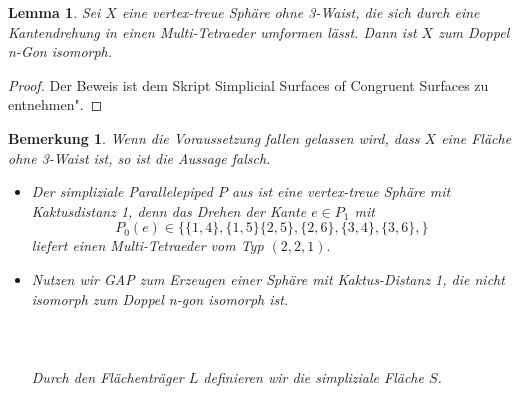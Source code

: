 \documentclass[12pt,titlepage,twoside,cleardoublepage]{article}
\theoremstyle{nummermitklammern}
\newtheorem{lemma}[temp]{Lemma}
\newtheorem{bemerkung}[temp]{Bemerkung}
\newtheorem{lemma}[zahl]{Lemma}
\newtheorem{bemerkung}[zahl]{Bemerkung}
\numberwithin{equation}{section}
\begin{document}
\begin{lemma}
Sei $X$ eine vertex-treue Sphäre ohne 3-Waist, die  sich durch eine Kantendrehung in einen Multi-Tetraeder umformen lässt. Dann ist $X$  zum Doppel n-Gon isomorph.
\end{lemma} 
\begin{proof}
Der Beweis ist dem Skript  Simplicial Surfaces of Congruent Surfaces zu entnehmen".
\end{proof}
\begin{bemerkung}
Wenn die Voraussetzung fallen gelassen wird, dass $X$ eine Fläche ohne 3-Waist ist, so ist die Aussage falsch. 
\begin{itemize}
\item Der simpliziale Parallelepiped $P$ aus  ist eine vertex-treue Sphäre mit Kaktusdistanz 1, denn das Drehen der Kante $e\in P_1$ mit 
\[
P_0(e)\in\{\{1,4\},\{1,5\}\{2,5\},\{2,6\},\{3,4\},\{3,6\},\}
\] liefert einen Multi-Tetraeder vom Typ $(2,2,1).$
\item Nutzen wir GAP zum Erzeugen einer Sphäre mit Kaktus-Distanz 1, die nicht isomorph zum Doppel n-gon isomorph ist. \\\\
\fbox{
\parbox{13.4cm}{
\textcolor{red}{$gap>$} \textcolor{blue}{$L:=[[ 2, 3, 5 ], [ 2, 4, 5 ], [ 3, 4, 5 ], [ 1, 3, 6 ], [ 1, 4, 6 ], 
  [ 3, 4, 6 ], [ 1, 7, 8 ], [ 1, 4, 7 ],\newline [ 2, 4, 7 ], [ 2, 7, 8 ], [ 1, 3, 8 ], [ 2, 3, 8 ] ];;$}
  }}\\\\
  Durch den Flächenträger $L$ definieren wir die simpliziale Fläche $S$.\\\\
  \\\\

\end{itemize}
\end{bemerkung}
\end{document}
